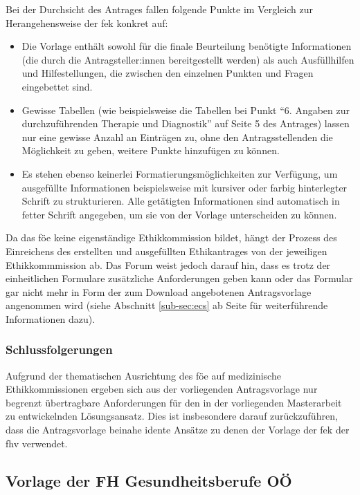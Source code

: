 \documentclass[a4paper,12pt,twoside]{scrreprt}
\begin{document}
Bei der Durchsicht des Antrages fallen folgende Punkte im Vergleich zur Herangehensweise der \ac{fek} konkret auf:
\begin{itemize}
    \item Die Vorlage enthält sowohl für die finale Beurteilung benötigte Informationen (die durch die Antragsteller:innen bereitgestellt werden) als auch Ausfüllhilfen und Hilfestellungen, die zwischen den einzelnen Punkten und Fragen eingebettet sind.
    \item Gewisse Tabellen (wie beispielsweise die Tabellen bei Punkt \enquote{6. Angaben zur durchzuführenden Therapie und Diagnostik} auf Seite 5 des Antrages) lassen nur eine gewisse Anzahl an Einträgen zu, ohne den Antragsstellenden die Möglichkeit zu geben, weitere Punkte hinzufügen zu können.
    \item Es stehen ebenso keinerlei Formatierungsmöglichkeiten zur Verfügung, um ausgefüllte Informationen beispielsweise mit kursiver oder farbig hinterlegter Schrift zu strukturieren. Alle getätigten Informationen sind automatisch in fetter Schrift angegeben, um sie von der Vorlage unterscheiden zu können.
\end{itemize}

Da das \ac{föe} keine eigenständige Ethikkommission bildet, hängt der Prozess des Einreichens des erstellten und ausgefüllten Ethikantrages von der jeweiligen Ethikkommmission ab. Das Forum weist jedoch darauf hin, dass es trotz der einheitlichen Formulare zusätzliche Anforderungen geben kann oder das Formular gar nicht mehr in Form der zum Download angebotenen Antragsvorlage angenommen wird (siehe Abschnitt \ref{sub-sec:ecs} ab Seite \pageref{sub-sec:ecs} für weiterführende Informationen dazu). \cite{ethikkommission_der_medizinischen_universitat_graz_download_2012}

\subsubsection*{Schlussfolgerungen}
\label{sub-sub-sec:schlussfolgerungen-föe}

Aufgrund der thematischen Ausrichtung des \acl{föe} auf medizinische Ethikkommissionen ergeben sich aus der vorliegenden Antragsvorlage nur begrenzt übertragbare Anforderungen für den in der vorliegenden Masterarbeit zu entwickelnden Lösungsansatz. Dies ist insbesondere darauf zurückzuführen, dass die Antragsvorlage beinahe idente Ansätze zu denen der Vorlage der \acl{fek} der \acl{fhv} verwendet.

\subsection{Vorlage der FH Gesundheitsberufe OÖ}
\label{sub-cec:vorlage-fh-oö}
\end{document}
